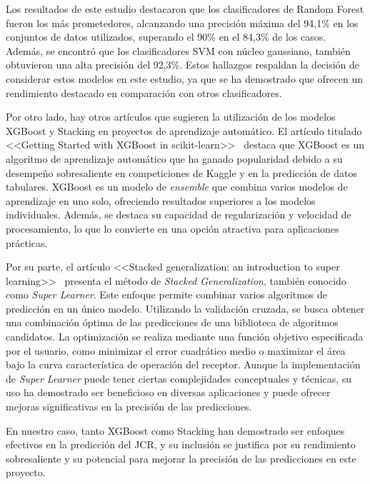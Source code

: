 Los resultados de este estudio destacaron que los clasificadores de Random Forest fueron los más prometedores, alcanzando una precisión máxima del 94,1\% en los conjuntos de datos utilizados, superando el 90\% en el 84,3\% de los casos. Además, se encontró que los clasificadores SVM con núcleo gaussiano, también obtuvieron una alta precisión del 92,3\%. Estos hallazgos respaldan la decisión de considerar estos modelos en este estudio, ya que se ha demostrado que ofrecen un rendimiento destacado en comparación con otros clasificadores.

Por otro lado, hay otros artículos que sugieren la utilización de los modelos XGBoost y Stacking en proyectos de aprendizaje automático. El artículo titulado <<Getting Started with XGBoost in scikit-learn>>~\cite{Wade2020} destaca que XGBoost es un algoritmo de aprendizaje automático que ha ganado popularidad debido a su desempeño sobresaliente en competiciones de Kaggle y en la predicción de datos tabulares. XGBoost es un modelo de \textit{ensemble} que combina varios modelos de aprendizaje en uno solo, ofreciendo resultados superiores a los modelos individuales. Además, se destaca su capacidad de regularización y velocidad de procesamiento, lo que lo convierte en una opción atractiva para aplicaciones prácticas.

Por su parte, el artículo <<Stacked generalization: an introduction to super learning>>~\cite{naimi2018} presenta el método de \textit{Stacked Generalization}, también conocido como \textit{Super Learner}. Este enfoque permite combinar varios algoritmos de predicción en un único modelo. Utilizando la validación cruzada, se busca obtener una combinación óptima de las predicciones de una biblioteca de algoritmos candidatos. La optimización se realiza mediante una función objetivo especificada por el usuario, como minimizar el error cuadrático medio o maximizar el área bajo la curva característica de operación del receptor. Aunque la implementación de \textit{Super Learner} puede tener ciertas complejidades conceptuales y técnicas, su uso ha demostrado ser beneficioso en diversas aplicaciones y puede ofrecer mejoras significativas en la precisión de las predicciones.

En nuestro caso, tanto XGBoost como Stacking han demostrado ser enfoques efectivos en la predicción del JCR, y su inclusión se justifica por su rendimiento sobresaliente y su potencial para mejorar la precisión de las predicciones en este proyecto.



